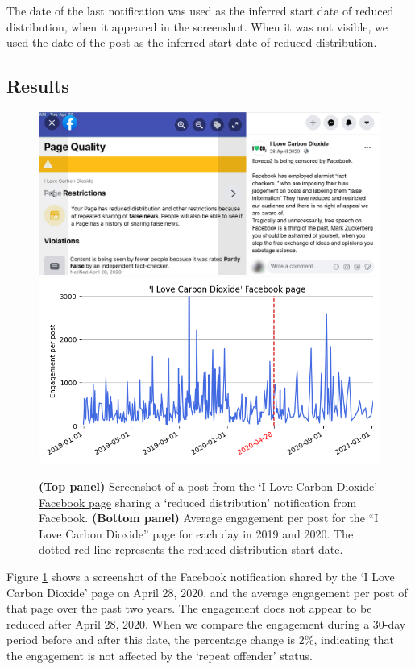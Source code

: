 \documentclass[review]{elsarticle}
\begin{document}
{The date of the last notification was used as the inferred start date of reduced distribution, when it appeared in the screenshot. 
When it was not visible, we used the date of the post as the inferred start date of reduced distribution. 

\subsection{Results}

\begin{figure}[!h]
\centering
\includegraphics[scale=0.12]{./../figure/reduce_example_screenshot.png}
\includegraphics[scale=0.5]{./../figure/reduce_example_timeseries.png}
\caption{
{\bf(Top panel)} Screenshot of a \href{https://archive.is/ie4dR}{post from the `I Love Carbon Dioxide' Facebook page} sharing a `reduced distribution' notification from Facebook. 
{\bf(Bottom panel)} Average engagement per post for the “I Love Carbon Dioxide” page for each day in 2019 and 2020.
The dotted red line represents the reduced distribution start date.
}
\label{reduce_example}
\end{figure}

Figure \ref{reduce_example} shows a screenshot of the Facebook notification shared by the ‘I Love Carbon Dioxide’ page on April 28, 2020, and the average engagement per post of that page over the past two years. 
The engagement does not appear to be reduced after April 28, 2020. 
When we compare the engagement during a 30-day period before and after this date, the percentage change is $2\%$, indicating that the engagement is not affected by the `repeat offender' status.

}
\end{document}
